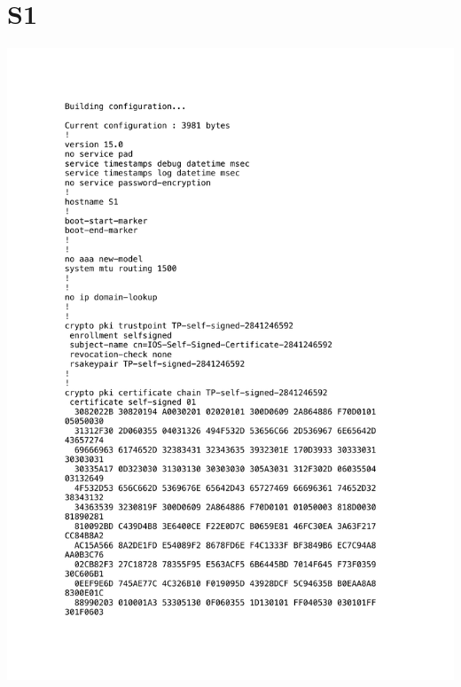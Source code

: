 \documentclass[11pt,a4paper]{scrreprt}
\begin{document}
\section{S1}
\vspace{-1cm}
\includegraphics[height=\dimexpr\textheight-4\baselineskip\relax,page=1]{../config_files/S1.pdf}

\end{document}
